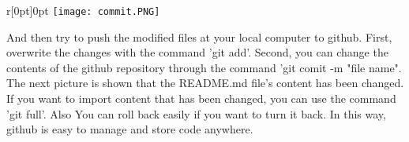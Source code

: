 \documentclass[10pt]{article} %
\begin{document}
\begin{minipage}[t]{.95\linewidth}
\begin{wrapfigure}[8]{r}[0pt]{0pt}
\texttt{[image: commit.PNG]}
\end{wrapfigure}
And then try to push the modified files at your local computer to github. First, overwrite the changes with the command 'git add'. Second, you can change the contents of the github repository through the command 'git comit -m "file name". The next picture is shown that the README.md file's content has been changed.\\
If you want to import content that has been changed, you can use the command 'git full'. Also You can roll back easily if you want to turn it back. In this way, github is easy to manage and store code anywhere.

\end{minipage}
\end{document}
